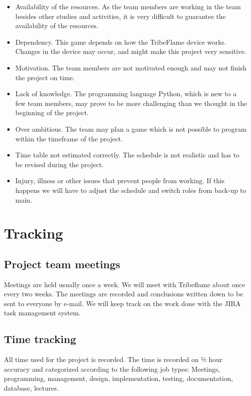 \documentclass[12pt,a4paper]{article}
\begin{document}
\begin{itemize}
\item Availability of the resources. As the team members are working in the team besides other studies and activities, it is very difficult to guarantee the availability of the resources.
\item Dependency. This game depends on how the TribeFlame device works. Changes in the device may occur, and might make this project very sensitive.
\item Motivation. The team members are not motivated enough and may not finish the project on time.
\item Lack of knowledge. The programming language Python, which is new to a few team members, may prove to be more challenging than we thought in the beginning of the project.
\item Over ambitious. The team may plan a game which is not possible to program within the timeframe of the project.
\item Time table not estimated correctly. The schedule is not realistic and has to be revised during the project.
\item Injury, illness or other issues that prevent people from working. If this happens we will have to adjust the schedule and switch roles from back-up to main.
\end{itemize}

\section{Tracking}

\subsection{Project team meetings}

Meetings are held usually once a week. We will meet with Tribeflame
about once every two weeks. The meetings are recorded and conclusions
written down to be sent to everyone by e-mail.  We will keep track on
the work done with the JIRA task management system.

\subsection{Time tracking}

All time used for the project is recorded.  The time is recorded on ½
hour accuracy and categorized according to the following job types:
Meetings, programming, management, design, implementation, testing,
documentation, database, lectures.
\end{document}

